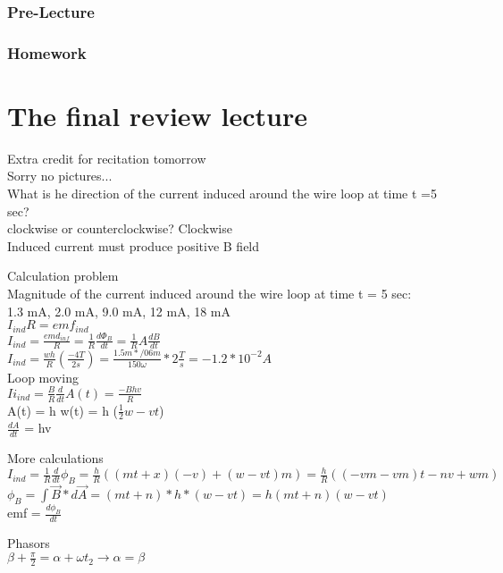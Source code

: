 \documentclass{article}
\begin{document}
\subsubsection{Pre-Lecture}
\subsubsection{Homework}

\section{The final review lecture}
\noindent
Extra credit for recitation tomorrow \\
Sorry no pictures... \\
What is he direction of the current induced around the wire loop at time t =5 sec? \\
clockwise or counterclockwise? Clockwise \\
Induced current must produce positive B field

\vspace{2mm}

\noindent
Calculation problem \\
Magnitude of the current induced around the wire loop at time t = 5 sec: \\
1.3 mA, 2.0 mA, 9.0 mA, 12 mA, 18 mA \\
$I_{ind}R = emf_{ind}$ \\
$I_{ind} = \frac{emd_{inf}}{R} = \frac{1}{R} \frac{d\Phi_B}{dt} = \frac{1}{R} A \frac{dB}{dt}$ \\
$I_{ind} = \frac{wh}{R}(\frac{-4T}{2s}) = \frac{1.5m*/06m}{150 \omega} * 2 \frac{T}{s} = -1.2*10^{-2} A$ \\
Loop moving \\
$Ii_{ind} = \frac{B}{R} \frac{d}{dt} A(t) = \frac{-Bhv}{R}$ \\
A(t) = h w(t) = h ($\frac{1}{2}w - vt$) \\
$\frac{dA}{dt}$ = hv 

\vspace{2mm}

\noindent
More calculations \\
$I_{ind} = \frac{1}{R} \frac{d}{dt} \phi_B = \frac{h}{R} ((mt+x)(-v)+(w-vt)m) = \frac{h}{R} ((-vm-vm)t-nv+wm)$ \\
$\phi_B =\int \vec{B}*d\vec{A} = (mt+n)*h*(w-vt)  = h(mt+n)(w-vt)$ \\
emf = $\frac{d\phi_B}{dt}$

\vspace{2mm}
Phasors \\
$\beta + \frac{\pi}{2} = \alpha + \omega t_2 \to \alpha = \beta$
\end{document}
